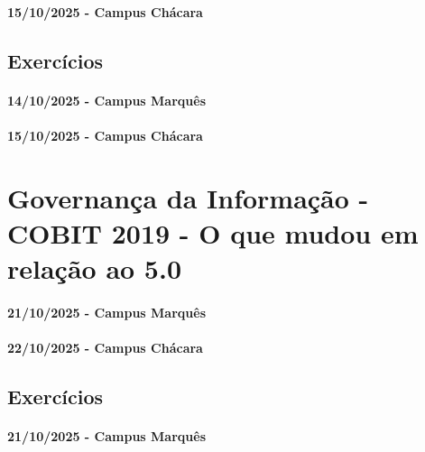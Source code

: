 \documentclass[
]{book}
\begin{document}
\subsubsection*{15/10/2025 - Campus Chácara}\label{campus-chuxe1cara-12}

\section{Exercícios}\label{exercuxedcios-8}

\subsubsection*{14/10/2025 - Campus Marquês}\label{campus-marquuxeas-13}

\subsubsection*{15/10/2025 - Campus Chácara}\label{campus-chuxe1cara-13}

\chapter{Governança da Informação - COBIT 2019 - O que mudou em relação ao 5.0}\label{governanuxe7a-da-informauxe7uxe3o---cobit-2019---o-que-mudou-em-relauxe7uxe3o-ao-5.0}

\subsubsection*{21/10/2025 - Campus Marquês}\label{campus-marquuxeas-14}

\subsubsection*{22/10/2025 - Campus Chácara}\label{campus-chuxe1cara-14}

\section{Exercícios}\label{exercuxedcios-9}

\subsubsection*{21/10/2025 - Campus Marquês}\label{campus-marquuxeas-15}
\end{document}

